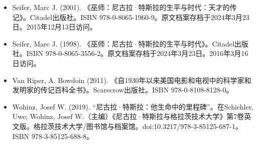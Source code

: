 \begin{itemize}
\item Seifer, Marc J. (2001). 《巫师：尼古拉·特斯拉的生平与时代：天才的传记》。Citadel出版社。ISBN 978-0-8065-1960-9。原文档案存档于2024年3月23日。2015年12月13日访问。  
\item Seifer, Marc J. (1998). 《巫师：尼古拉·特斯拉的生平与时代》。Citadel出版社。ISBN 978-0-8065-3556-2。原文档案存档于2024年3月23日。2016年3月16日访问。  
\item Van Riper, A. Bowdoin (2011). 《自1930年以来美国电影和电视中的科学家和发明家的传记百科全书》。Scarecrow出版社。ISBN 978-0-8108-8128-0。  
\item Wohinz, Josef W. (2019). “尼古拉·特斯拉：他生命中的里程碑”。在Schichler, Uwe; Wohinz, Josef W.（主编）《尼古拉·特斯拉与格拉茨技术大学》第7卷英文版。格拉茨技术大学/图书馆与档案馆。doi:10.3217/978-3-85125-687-1。ISBN 978-3-85125-688-8。
\end{itemize}
